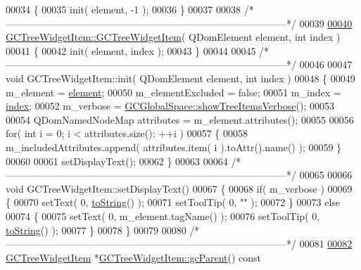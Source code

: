 \begin{DoxyCode}
00034 \{
00035   init( element, -1 );
00036 \}
00037 
00038 \textcolor{comment}{/*
      --------------------------------------------------------------------------------------*/}
00039 
\hypertarget{gctreewidgetitem_8cpp_source_l00040}{}\hyperlink{class_g_c_tree_widget_item_a82819ce07ee6d70fe41518c8a0382fcf}{00040} \hyperlink{class_g_c_tree_widget_item_ab8ffe3b11f00edd90397b885bb58d4a4}{GCTreeWidgetItem::GCTreeWidgetItem}( QDomElement element, \textcolor{keywordtype}{int} index )
00041 \{
00042   init( element, index );
00043 \}
00044 
00045 \textcolor{comment}{/*
      --------------------------------------------------------------------------------------*/}
00046 
00047 \textcolor{keywordtype}{void} GCTreeWidgetItem::init( QDomElement element, \textcolor{keywordtype}{int} index )
00048 \{
00049   m\_element = \hyperlink{class_g_c_tree_widget_item_a584cad866bdbd94710d31eb77b804d84}{element};
00050   m\_elementExcluded = \textcolor{keyword}{false};
00051   m\_index = \hyperlink{class_g_c_tree_widget_item_af6b48ae274cc4989811ef44944c8ad76}{index};
00052   m\_verbose = \hyperlink{namespace_g_c_global_space_ad9a35f311bda4dd28f5cf155c5efc818}{GCGlobalSpace::showTreeItemsVerbose}();
00053 
00054   QDomNamedNodeMap attributes = m\_element.attributes();
00055 
00056   \textcolor{keywordflow}{for}( \textcolor{keywordtype}{int} i = 0; i < attributes.size(); ++i )
00057   \{
00058     m\_includedAttributes.append( attributes.item( i ).toAttr().name() );
00059   \}
00060 
00061   setDisplayText();
00062 \}
00063 
00064 \textcolor{comment}{/*
      --------------------------------------------------------------------------------------*/}
00065 
00066 \textcolor{keywordtype}{void} GCTreeWidgetItem::setDisplayText()
00067 \{
00068   \textcolor{keywordflow}{if}( m\_verbose )
00069   \{
00070     setText( 0, \hyperlink{class_g_c_tree_widget_item_acbd4573d56cc5c6d9bd58c461b797115}{toString}() );
00071     setToolTip( 0, \textcolor{stringliteral}{""} );
00072   \}
00073   \textcolor{keywordflow}{else}
00074   \{
00075     setText( 0, m\_element.tagName() );
00076     setToolTip( 0, \hyperlink{class_g_c_tree_widget_item_acbd4573d56cc5c6d9bd58c461b797115}{toString}() );
00077   \}
00078 \}
00079 
00080 \textcolor{comment}{/*
      --------------------------------------------------------------------------------------*/}
00081 
\hypertarget{gctreewidgetitem_8cpp_source_l00082}{}\hyperlink{class_g_c_tree_widget_item_a1125dbc55a8ba3e50662b8258cb35fdf}{00082} \hyperlink{class_g_c_tree_widget_item}{GCTreeWidgetItem} *\hyperlink{class_g_c_tree_widget_item_a1125dbc55a8ba3e50662b8258cb35fdf}{GCTreeWidgetItem::gcParent}()\textcolor{keyword}{ const}

\end{DoxyCode}
